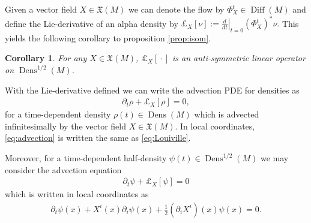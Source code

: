 \documentclass[letterpaper, 10 pt, conference]{ieeeconf}
\newtheorem{cor}[thm]{Corollary}
\DeclareMathOperator{\Diff}{Diff}
\DeclareMathOperator{\Dens}{Dens}
\begin{document}
  Given a vector field $X \in \mathfrak{X}(M)$
  we can denote the flow by $\Phi^t_X \in \Diff(M)$
  and define the Lie-derivative of an alpha density by
  $
    \pounds_X[ \nu ] := \left. \frac{d}{dt} \right|_{t=0} (\Phi_X^t)^* \nu.
  $
  This yields the following corollary to proposition \ref{prop:isom}.
  \begin{cor}
    For any $X \in \mathfrak{X}(M)$, $\pounds_X[ {}\cdot{} ]$
    is an anti-symmetric linear operator on $\Dens^{1/2}(M)$.
  \end{cor}
  With the Lie-derivative defined we can write the advection
  PDE for densities as
  \begin{align}
    \partial_t \rho + \pounds_X[\rho] = 0 \label{eq:advection},
  \end{align}
  for a time-dependent density $\rho(t) \in \Dens(M)$
  which is advected infinitesimally by the vector field 
  $X \in \mathfrak{X}(M)$.
  In local coordinates, \eqref{eq:advection} is written the same
  as \eqref{eq:Louiville}.

  Moreover, for a time-dependent half-density $\psi(t) \in \Dens^{1/2}(M)$
  we may consider the advection equation
  \begin{align}
    \partial_t \psi + \pounds_X[\psi] = 0 \label{eq:advection2}
  \end{align}
  which is written in local coordinates as
  \begin{align*}
    \partial_t \psi(x) 
    + X^i(x) \partial_i \psi(x) 
    + \frac{1}{2} (\partial_i X^i)(x) \psi(x) = 0.
  \end{align*}
  
\end{document}
